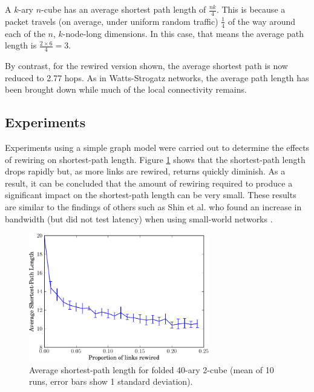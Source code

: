 			A $k$-ary $n$-cube has an average shortest path length of $\frac{nk}{4}$.
			This is because a packet travels (on average, under uniform random
			traffic) $\frac{1}{4}$ of the way around each of the $n$, $k$-node-long
			dimensions. In this case, that means the average path length is $\frac{2
			\times 6}{4} = 3$.
			
			By contrast, for the rewired version shown, the average shortest path is
			now reduced to 2.77 hops. As in Watts-Strogatz networks, the average path
			length has been brought down while much of the local connectivity remains.
		
		
		\subsection{Experiments}
			
			Experiments using a simple graph model were carried out to determine the
			effects of rewiring on shortest-path length. Figure
			\ref{fig:smallWorldTorus} shows that the shortest-path length drops
			rapidly but, as more links are rewired, returns quickly diminish. As a
			result, it can be concluded that the amount of rewiring required to
			produce a significant impact on the shortest-path length can be very
			small. These results are similar to the findings of others such as Shin et
			al. who found an increase in bandwidth (but did not test latency) when
			using small-world networks \cite{shin11}.
			
			\begin{figure}
				\center
				\includegraphics[width=0.7\textwidth]{figures/smallWorldTorus}
				\caption[Average shortest-path length for folded 40-ary 2-cube.]{Average
				shortest-path length for folded 40-ary 2-cube (mean of 10 runs, error
				bars show 1 standard deviation).}
				\label{fig:smallWorldTorus}
			\end{figure}
			
